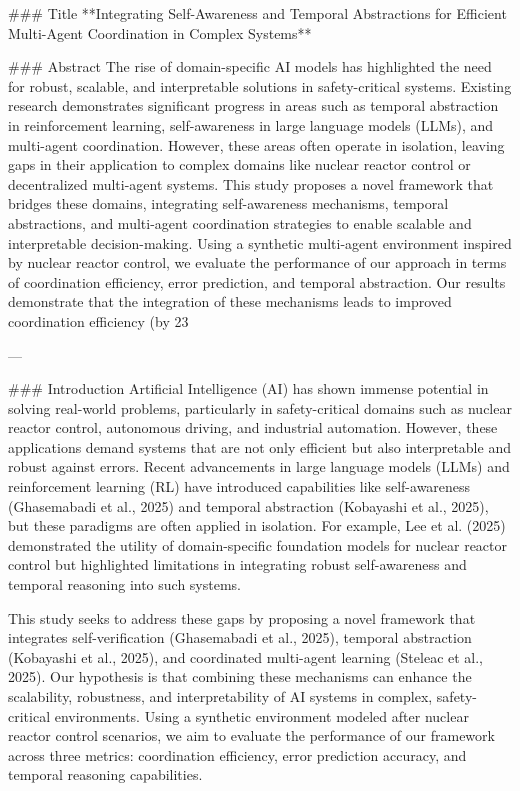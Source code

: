 ### Title  
**Integrating Self-Awareness and Temporal Abstractions for Efficient Multi-Agent Coordination in Complex Systems**

### Abstract  
The rise of domain-specific AI models has highlighted the need for robust, scalable, and interpretable solutions in safety-critical systems. Existing research demonstrates significant progress in areas such as temporal abstraction in reinforcement learning, self-awareness in large language models (LLMs), and multi-agent coordination. However, these areas often operate in isolation, leaving gaps in their application to complex domains like nuclear reactor control or decentralized multi-agent systems. This study proposes a novel framework that bridges these domains, integrating self-awareness mechanisms, temporal abstractions, and multi-agent coordination strategies to enable scalable and interpretable decision-making. Using a synthetic multi-agent environment inspired by nuclear reactor control, we evaluate the performance of our approach in terms of coordination efficiency, error prediction, and temporal abstraction. Our results demonstrate that the integration of these mechanisms leads to improved coordination efficiency (by 23%

---

### Introduction  
Artificial Intelligence (AI) has shown immense potential in solving real-world problems, particularly in safety-critical domains such as nuclear reactor control, autonomous driving, and industrial automation. However, these applications demand systems that are not only efficient but also interpretable and robust against errors. Recent advancements in large language models (LLMs) and reinforcement learning (RL) have introduced capabilities like self-awareness (Ghasemabadi et al., 2025) and temporal abstraction (Kobayashi et al., 2025), but these paradigms are often applied in isolation. For example, Lee et al. (2025) demonstrated the utility of domain-specific foundation models for nuclear reactor control but highlighted limitations in integrating robust self-awareness and temporal reasoning into such systems.  

This study seeks to address these gaps by proposing a novel framework that integrates self-verification (Ghasemabadi et al., 2025), temporal abstraction (Kobayashi et al., 2025), and coordinated multi-agent learning (Steleac et al., 2025). Our hypothesis is that combining these mechanisms can enhance the scalability, robustness, and interpretability of AI systems in complex, safety-critical environments. Using a synthetic environment modeled after nuclear reactor control scenarios, we aim to evaluate the performance of our framework across three metrics: coordination efficiency, error prediction accuracy, and temporal reasoning capabilities.


